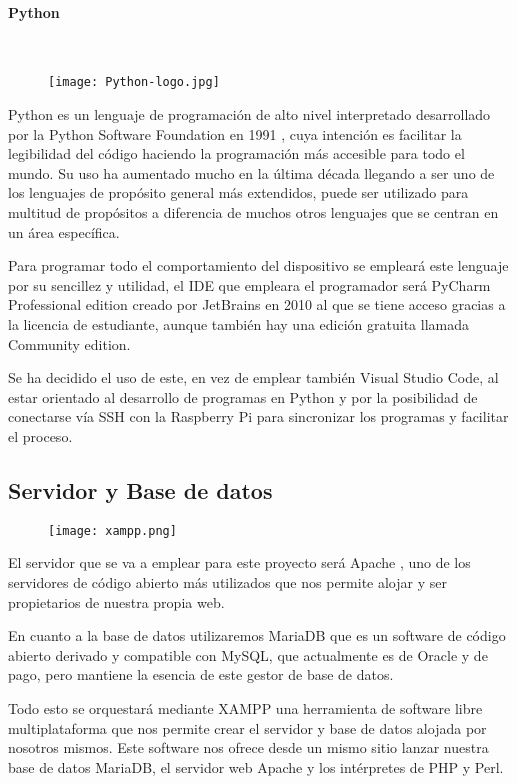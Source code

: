 \paragraph{Python}\mbox{} \\
\begin{figure}[H]
	{\texttt{[image: Python-logo.jpg]}}
\end{figure}
Python es un lenguaje de programación de alto nivel interpretado desarrollado por la Python Software Foundation en 1991 \cite{montoro_python_2012}, cuya intención es facilitar la legibilidad del código haciendo la programación más accesible para todo el mundo. Su uso ha aumentado mucho en la última década llegando a ser uno de los lenguajes de propósito general más extendidos, puede ser utilizado para multitud de propósitos a diferencia de muchos otros lenguajes que se centran en un área específica.

Para programar todo el comportamiento del dispositivo se empleará este lenguaje por su sencillez y utilidad, el IDE que empleara el programador será PyCharm Professional edition creado por JetBrains en 2010 \cite{noauthor_pycharm_2021} al que se tiene acceso gracias a la licencia de estudiante, aunque también hay una edición gratuita llamada Community edition.

Se ha decidido el uso de este, en vez de emplear también Visual Studio Code, al estar orientado al desarrollo de programas en Python y por la posibilidad de conectarse vía SSH con la Raspberry Pi para sincronizar los programas y facilitar el proceso.

\subsection{Servidor y Base de datos}
\begin{figure}[H]
	{\texttt{[image: xampp.png]}}
\end{figure}
El servidor que se va a emplear para este proyecto será Apache \cite{noauthor_apache_nodate}, uno de los servidores de código abierto más utilizados que nos permite alojar y ser propietarios de nuestra propia web.

En cuanto a la base de datos utilizaremos MariaDB \cite{noauthor_mariadb_nodate} que es un software de código abierto derivado y compatible con MySQL, que actualmente es de Oracle y de pago, pero mantiene la esencia de este gestor de base de datos.

Todo esto se orquestará mediante XAMPP una herramienta de software libre multiplataforma \cite{noauthor_xampp_nodate} que nos permite crear el servidor y base de datos alojada por nosotros mismos. Este software nos ofrece desde un mismo sitio lanzar nuestra base de datos MariaDB, el servidor web Apache y los intérpretes de PHP y Perl.